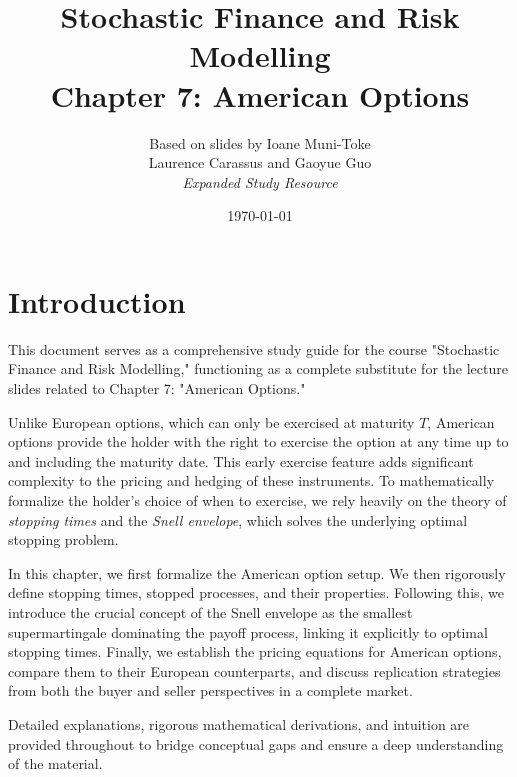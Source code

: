 \documentclass[12pt, a4paper]{report}
\title{\textbf{Stochastic Finance and Risk Modelling} \\ \large Chapter 7: American Options}
\author{Based on slides by Ioane Muni-Toke \\ Laurence Carassus and Gaoyue Guo \\ \textit{Expanded Study Resource}}
\date{\today}
\theoremstyle{definition}
\begin{document}
\maketitle

\tableofcontents

\chapter*{Introduction}
This document serves as a comprehensive study guide for the course "Stochastic Finance and Risk Modelling," functioning as a complete substitute for the lecture slides related to Chapter 7: "American Options."

Unlike European options, which can only be exercised at maturity $T$, American options provide the holder with the right to exercise the option at any time up to and including the maturity date. This early exercise feature adds significant complexity to the pricing and hedging of these instruments. To mathematically formalize the holder's choice of when to exercise, we rely heavily on the theory of \textit{stopping times} and the \textit{Snell envelope}, which solves the underlying optimal stopping problem.

In this chapter, we first formalize the American option setup. We then rigorously define stopping times, stopped processes, and their properties. Following this, we introduce the crucial concept of the Snell envelope as the smallest supermartingale dominating the payoff process, linking it explicitly to optimal stopping times. Finally, we establish the pricing equations for American options, compare them to their European counterparts, and discuss replication strategies from both the buyer and seller perspectives in a complete market.

Detailed explanations, rigorous mathematical derivations, and intuition are provided throughout to bridge conceptual gaps and ensure a deep understanding of the material.





\end{document}
